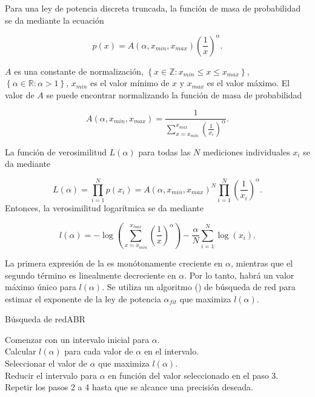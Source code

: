 Para una ley de potencia discreta truncada, la función de masa de probabilidad se da mediante la ecuación


\begin{equation}\label{eq:90}
	p(x)=A\left(\alpha, x_{min}, x_{max}\right)\left(\frac{1}{x}\right)^\alpha.
\end{equation}

$A$  es una constante de normalización, $\left\{x\in\mathbb{Z}: x_{min}\leq x \leq x_{max} \right\}$, $\left\{\alpha\in\mathbb{R}:\alpha>1\right\}$, $x_{min}$ es el valor mínimo de $x$ y $x_{max}$ es el valor máximo. El valor de $A$ se puede encontrar normalizando la función de masa de probabilidad

\begin{equation}
	A(\alpha,x_{min},x_{max})=\frac{1}{\sum_{x=x_{min}}^{x_{max}}\left(\frac{1}{x_i}\right)^{\alpha}}.
\end{equation} 

La función de verosimilitud $L(\alpha)$ para todas las $N$ mediciones individuales $x_i$ se da mediante 

\begin{equation}
	L(\alpha)=\prod_{i=1}^{N}p(x_i)=A(\alpha,x_{min},x_{max})^N\prod_{i=1}^{N}\left(\frac{1}{x_i}\right)^{\alpha}.
\end{equation}
Entonces, la verosimilitud logarítmica se da mediante 

\begin{equation}\label{eq:91}
	l(\alpha)=-\log\left(\sum_{x=x_{min}}^{x_{max}}\left(\frac{1}{x}\right)^\alpha\right)-\frac{\alpha}{N}\sum_{i=1}^{N}\log(x_i).
\end{equation}

La primera expresión de la  es monótonamente creciente en $\alpha$, mientras que el segundo término es linealmente decreciente en $\alpha$. Por lo tanto, habrá un valor máximo único para $l(\alpha)$.  Se utiliza un algoritmo () de búsqueda de red para estimar el exponente de la ley de potencia $\alpha_{fit}$ que maximiza $l(\alpha)$.

\begin{algorithm}{Búsqueda de red}{ABR}
	
	\begin{pseudo}
	Comenzar con un intervalo inicial para $\alpha$.\\
	Calcular $l(\alpha)$ para cada valor de $\alpha$ en el intervalo.\\
	Seleccionar el valor de $\alpha$ que maximiza $l(\alpha)$.\\
	Reducir el intervalo para $\alpha$ en función del valor seleccionado en el paso 3.\\
	Repetir los pasos 2 a 4 hasta que se alcance una precisión deseada.
	\end{pseudo}
\end{algorithm}


